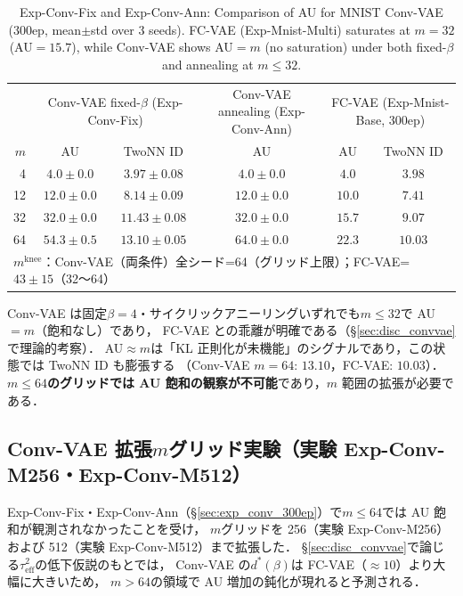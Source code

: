 \documentclass[11pt,a4paper]{jsarticle}
\newcommand{\mknee}{m^{\mathrm{knee}}}
\begin{document}
\begin{table}[H]
\centering
\caption{Exp-Conv-Fix and Exp-Conv-Ann: Comparison of AU for MNIST Conv-VAE (300ep, mean$\pm$std over 3 seeds). FC-VAE (Exp-Mnist-Multi) saturates at $m=32$ (AU$=15.7$), while Conv-VAE shows AU$=m$ (no saturation) under both fixed-$\beta$ and annealing at $m \leq 32$.}
\label{tab:eh_conv_vae}
\small
\begin{tabular}{r ccc cc}
\toprule
 & \multicolumn{2}{c}{Conv-VAE fixed-$\beta$ (Exp-Conv-Fix)} & \multicolumn{1}{c}{Conv-VAE annealing (Exp-Conv-Ann)} & \multicolumn{2}{c}{FC-VAE (Exp-Mnist-Base, 300ep)} \\
$m$ & AU & TwoNN ID & AU & AU & TwoNN ID \\
\midrule
 4 & $4.0\pm0.0$ & $3.97\pm0.08$ & $4.0\pm0.0$ & $4.0$ & $3.98$ \\
12 & $12.0\pm0.0$ & $8.14\pm0.09$ & $12.0\pm0.0$ & $10.0$ & $7.41$ \\
32 & $32.0\pm0.0$ & $11.43\pm0.08$ & $32.0\pm0.0$ & $15.7$ & $9.07$ \\
64 & $54.3\pm0.5$ & $13.10\pm0.05$ & $64.0\pm0.0$ & $22.3$ & $10.03$ \\
\midrule
\multicolumn{6}{l}{$\mknee$：Conv-VAE（両条件）全シード=64（グリッド上限）；FC-VAE=$43\pm15$（32〜64）} \\
\bottomrule
\end{tabular}
\end{table}

Conv-VAE は固定$\beta=4$・サイクリックアニーリングいずれでも$m \leq 32$で AU$=m$（飽和なし）であり，
FC-VAE との乖離が明確である（§\ref{sec:disc_convvae}で理論的考察）．
AU$\approx m$は「KL 正則化が未機能」のシグナルであり，この状態では TwoNN ID も膨張する
（Conv-VAE $m=64$: $13.10$，FC-VAE: $10.03$）．
\textbf{$m \leq 64$のグリッドでは AU 飽和の観察が不可能}であり，$m$ 範囲の拡張が必要である．

\subsection{Conv-VAE 拡張$m$グリッド実験（実験 Exp-Conv-M256・Exp-Conv-M512）}\label{sec:exp_en}

Exp-Conv-Fix・Exp-Conv-Ann（§\ref{sec:exp_conv_300ep}）で$m \leq 64$では AU 飽和が観測されなかったことを受け，
$m$グリッドを 256（実験 Exp-Conv-M256）および 512（実験 Exp-Conv-M512）まで拡張した．
§\ref{sec:disc_convvae}で論じる$\tau^2_\mathrm{eff}$の低下仮説のもとでは，
Conv-VAE の$d^*(\beta)$は FC-VAE（$\approx 10$）より大幅に大きいため，
$m>64$の領域で AU 増加の鈍化が現れると予測される．
\end{document}
